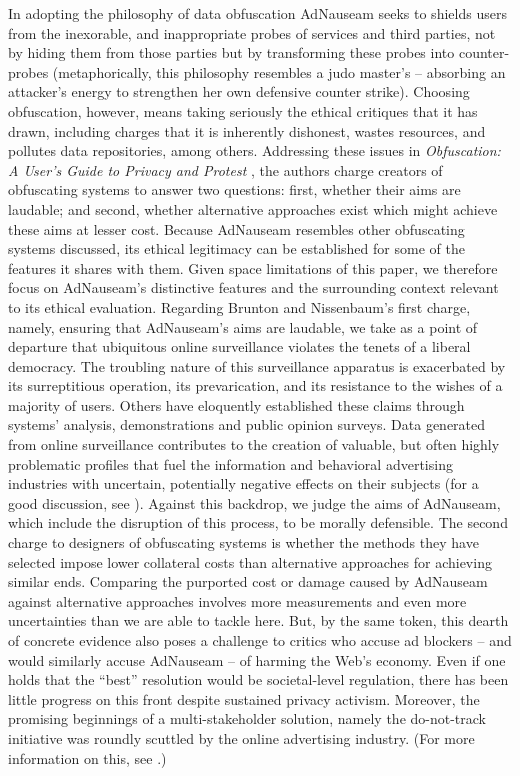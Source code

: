\documentclass[conference]{IEEEtran}
\begin{document}
In adopting the philosophy of data obfuscation AdNauseam seeks to shields users from the inexorable, and inappropriate probes of services and third parties, not by hiding them from those parties but by transforming these probes into counter-probes (metaphorically, this philosophy resembles a judo master's -- absorbing an attacker's energy to strengthen her own defensive counter strike). Choosing obfuscation, however, means taking seriously the ethical critiques that it has drawn, including charges that it is inherently dishonest, wastes resources, and pollutes data repositories, among others. Addressing these issues in \emph{Obfuscation: A User's Guide to Privacy and Protest} \cite{Brunton}, the authors charge creators of obfuscating systems to answer two questions: first, whether their aims are laudable; and second, whether alternative approaches exist which might achieve these aims at lesser cost. Because AdNauseam resembles other obfuscating systems discussed, its ethical legitimacy can be established for some of the features it shares with them. Given space limitations of this paper, we therefore focus on AdNauseam's distinctive features and the surrounding context relevant to its ethical evaluation.
Regarding Brunton and Nissenbaum's first charge, namely, ensuring that AdNauseam's aims are laudable, we take as a point of departure that ubiquitous online surveillance violates the tenets of a liberal democracy. The troubling nature of this surveillance apparatus is exacerbated by its surreptitious operation, its prevarication, and its resistance to the wishes of a majority of users. Others have eloquently established these claims through systems' analysis, demonstrations and public opinion surveys. \cite{Turow, Goldfarb, Malheiros, Tsai, Tucker} Data generated from online surveillance contributes to the creation of valuable, but often highly problematic profiles that fuel the information and behavioral advertising industries with uncertain, potentially negative effects on their subjects (for a good discussion, see \cite{Pasquale}). Against this backdrop, we judge the aims of AdNauseam, which include the disruption of this process, to be morally defensible.
The second charge to designers of obfuscating systems is whether the methods they have selected impose lower collateral costs than alternative approaches for achieving similar ends. Comparing the purported cost or damage caused by AdNauseam against alternative approaches involves more measurements and even more uncertainties than we are able to tackle here. But, by the same token, this dearth of concrete evidence also poses a challenge to critics who accuse ad blockers -- and would similarly accuse AdNauseam -- of harming the Web's economy. Even if one holds that the ``best'' resolution would be societal-level regulation, there has been little progress on this front despite sustained privacy activism. Moreover, the promising beginnings of a multi-stakeholder solution, namely the do-not-track initiative was roundly scuttled by the online advertising industry. (For more information on this, see \cite{Brunton}.)
\end{document}
